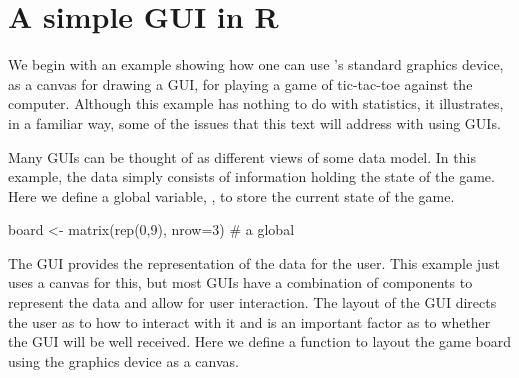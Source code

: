 \section{A simple GUI in R}
\label{sec:GUI:tic-tac-toe}

We begin with an example showing how one can use \R's standard
graphics device, as a canvas for drawing a GUI, for playing a game of
tic-tac-toe against the computer. Although this example
has nothing to do with statistics, it illustrates, in a familiar way,
some of the issues that this text will address with using GUIs. 



Many GUIs can be thought of as different views of some data
model. 
In this example, the data simply consists of information holding the
state of the game. Here we define a global variable, , to store the
current state of the game. 

\begin{Schunk}
\begin{Sinput}
 board <- matrix(rep(0,9), nrow=3)       # a global
\end{Sinput}
\end{Schunk}

The GUI provides the representation of the data for the user. This
example just uses a canvas for this, but most GUIs have a combination
of components to represent the data and allow for user
interaction. The layout of the GUI directs the user as to how to
interact with it and is an important factor as to whether the GUI will
be well received. Here we define a function to layout the game board
using the graphics device as a canvas.

